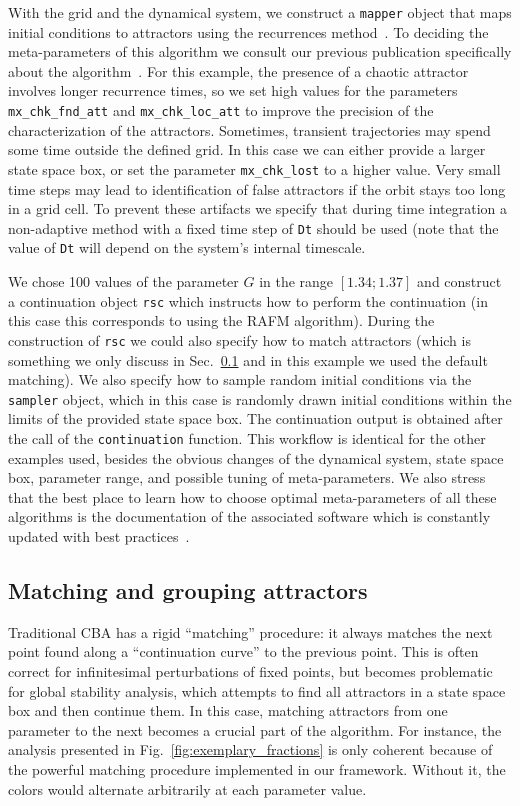 \documentclass[%
 aip,
 amsmath,amssymb,
 reprint,%
]{revtex4-1}
\begin{document}
With the grid and the dynamical system, we construct a \texttt{mapper} object that maps initial conditions to attractors using the recurrences method~\cite{DatserisWagemakers2022}. To deciding the meta-parameters of this algorithm we consult our previous publication specifically about the algorithm~\cite{DatserisWagemakers2022}. For this example, the presence of a chaotic attractor involves longer recurrence times, so we set high values for the parameters \texttt{mx\_chk\_fnd\_att} and \texttt{mx\_chk\_loc\_att} to improve the precision of the characterization of the attractors. Sometimes, transient trajectories may spend some time outside the defined grid. In this case we can either provide a larger state space box, or set the parameter \texttt{mx\_chk\_lost} to a higher value. Very small time steps may lead to identification of false attractors if the orbit stays too long in a grid cell. To prevent these artifacts we specify that during time integration a non-adaptive method with a fixed time step of \texttt{Dt} should be used (note that the value of \texttt{Dt} will depend on the system's internal timescale.

We chose 100 values of the parameter $G$ in the range $[1.34; 1.37]$ and construct a continuation object \texttt{rsc} which instructs how to perform the continuation (in this case this corresponds to using the RAFM algorithm). During the construction of \texttt{rsc} we could also specify how to match attractors (which is something we only discuss in Sec.~\ref{sec:matching} and in this example we used the default matching). We also specify how to sample random initial conditions via the \texttt{sampler} object, which in this case is randomly drawn initial conditions within the limits of the provided state space box. The continuation output is obtained after the call of the \texttt{continuation} function. This workflow is identical for the other examples used, besides the obvious changes of the dynamical system, state space box, parameter range, and possible tuning of meta-parameters. We also stress that the best place to learn how to choose optimal meta-parameters of all these algorithms is the documentation of the associated software which is constantly updated with best practices~\cite{Attractors.jl}.

\subsection{Matching and grouping attractors}
\label{sec:matching}
Traditional CBA has a rigid ``matching'' procedure: it always matches the next point found along a ``continuation curve'' to the previous point. This is often correct for infinitesimal perturbations of fixed points, but becomes problematic for global stability analysis, which attempts to find all attractors in a state space box and then continue them. In this case, matching attractors from one parameter to the next becomes a crucial part of the algorithm. For instance, the analysis presented in Fig.~\ref{fig:exemplary_fractions} is only coherent because of the powerful matching procedure implemented in our framework. Without it, the colors would alternate arbitrarily at each parameter value.
\end{document}
